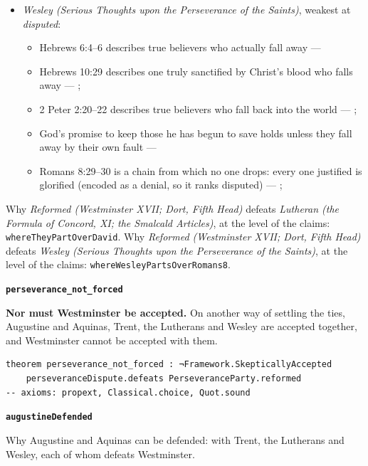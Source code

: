 \documentclass[11pt]{article}
\begin{document}
\begin{itemize}
\begin{itemize}
\end{itemize}
\item \emph{Wesley (Serious Thoughts upon the Perseverance of the Saints)}, weakest at \emph{disputed}:
\begin{itemize}
\item Hebrews 6:4–6 describes true believers who actually fall away --- \cite[449]{wesley-works-9-1827}
\item Hebrews 10:29 describes one truly sanctified by Christ’s blood who falls away --- \cite[448--449]{wesley-works-9-1827}; \cite[585]{wesley-explanatory-notes-nt}
\item 2 Peter 2:20–22 describes true believers who fall back into the world --- \cite[445--446]{wesley-works-9-1827}; \cite[625]{wesley-explanatory-notes-nt}
\item God’s promise to keep those he has begun to save holds unless they fall away by their own fault --- \cite[444--445]{wesley-works-9-1827}
\item Romans 8:29–30 is a chain from which no one drops: every one justified is glorified (encoded as a denial, so it ranks disputed) --- \cite[384]{wesley-explanatory-notes-nt}; \cite[413]{wesley-works-9-1827}
\end{itemize}
\end{itemize}
\noindent Why \emph{Reformed (Westminster XVII; Dort, Fifth Head)} defeats \emph{Lutheran (the Formula of Concord, XI; the Smalcald Articles)}, at the level of the claims: \texttt{where\allowbreak{}They\allowbreak{}Part\allowbreak{}Over\allowbreak{}David}.
\noindent Why \emph{Reformed (Westminster XVII; Dort, Fifth Head)} defeats \emph{Wesley (Serious Thoughts upon the Perseverance of the Saints)}, at the level of the claims: \texttt{where\allowbreak{}Wesley\allowbreak{}Parts\allowbreak{}Over\allowbreak{}Romans8}.
\par\medskip\noindent\textbf{\texttt{perseverance\_\allowbreak{}not\_\allowbreak{}forced}}\par\nobreak\noindent
\textbf{Nor must Westminster be accepted.} On another way of settling the ties, Augustine and Aquinas, Trent, the Lutherans and Wesley are accepted together, and Westminster cannot be accepted with them.

{\small\begin{verbatim}
theorem perseverance_not_forced : ¬Framework.SkepticallyAccepted
    perseveranceDispute.defeats PerseveranceParty.reformed
-- axioms: propext, Classical.choice, Quot.sound
\end{verbatim}}
\par\medskip\noindent\textbf{\texttt{augustine\allowbreak{}Defended}}\par\nobreak\noindent
Why Augustine and Aquinas can be defended: with Trent, the Lutherans and Wesley, each of whom defeats Westminster.
\end{document}
